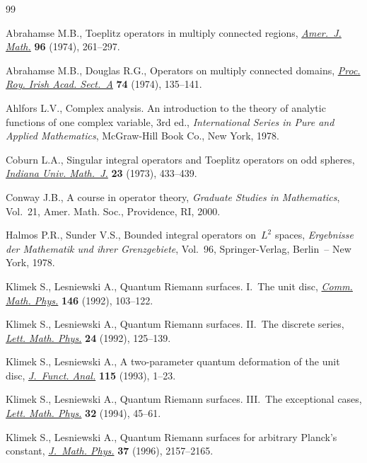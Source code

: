 \documentclass[pdftex]{sigma}
\numberwithin{equation}{section}
\begin{document}
\begin{thebibliography}{99}
\footnotesize \itemsep=0pt

Abrahamse M.B., Toeplitz operators in multiply connected regions,
  \href{http://dx.doi.org/10.2307/2373633}{\textit{Amer.~J. Math.}} \textbf{96} (1974), 261--297.

Abrahamse M.B., Douglas R.G., Operators on multiply connected domains,
  \href{http://dx.doi.org/10.2307/20488743}{\textit{Proc. Roy. Irish Acad. Sect.~A}} \textbf{74} (1974), 135--141.

Ahlfors L.V., Complex analysis. An introduction to the theory of analytic
  functions of one complex variable, 3rd ed., \textit{International Series in Pure and
  Applied Mathematics}, McGraw-Hill Book Co., New York, 1978.

Coburn L.A., Singular integral operators and {T}oeplitz operators on odd
  spheres, \href{http://dx.doi.org/10.1512/iumj.1974.23.23036}{\textit{Indiana Univ. Math.~J.}} \textbf{23} (1973), 433--439.

Conway J.B., A course in operator theory, \textit{Graduate Studies in
  Mathematics}, Vol.~21, Amer. Math. Soc., Providence, RI, 2000.

Halmos P.R., Sunder V.S., Bounded integral operators on~{$L^{2}$} spaces,
  \textit{Ergebnisse der Mathematik und ihrer Grenzgebiete}, Vol.~96,
  Springer-Verlag, Berlin~-- New York, 1978.

Klimek S., Lesniewski A., Quantum {R}iemann surfaces. {I}.~{T}he unit disc,
  \href{http://dx.doi.org/10.1007/BF02099210}{\textit{Comm. Math. Phys.}} \textbf{146} (1992), 103--122.

Klimek S., Lesniewski A., Quantum {R}iemann surfaces. {II}.~{T}he discrete
  series, \href{http://dx.doi.org/10.1007/BF00402676}{\textit{Lett. Math. Phys.}} \textbf{24} (1992), 125--139.

Klimek S., Lesniewski A., A two-parameter quantum deformation of the unit disc,
  \href{http://dx.doi.org/10.1006/jfan.1993.1078}{\textit{J.~Funct. Anal.}} \textbf{115} (1993), 1--23.

Klimek S., Lesniewski A., Quantum {R}iemann surfaces. {III}.~{T}he exceptional
  cases, \href{http://dx.doi.org/10.1007/BF00761123}{\textit{Lett. Math. Phys.}} \textbf{32} (1994), 45--61.

Klimek S., Lesniewski A., Quantum {R}iemann surfaces for arbitrary {P}lanck's
  constant, \href{http://dx.doi.org/10.1063/1.531503}{\textit{J.~Math. Phys.}} \textbf{37} (1996), 2157--2165.


\end{thebibliography}
\end{document}
